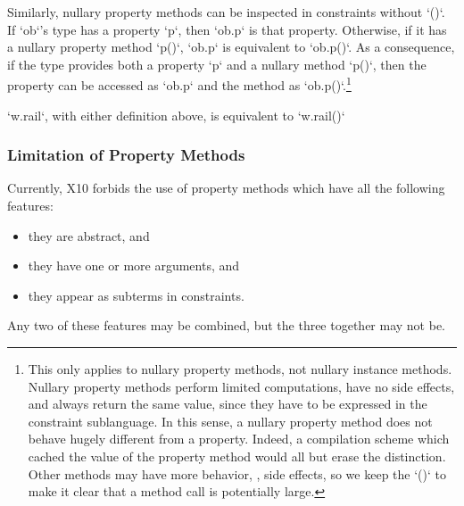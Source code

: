 Similarly, nullary property methods can be inspected in constraints without
\xcd`()`. If \xcd`ob`'s type has a property \xcd`p`, then \xcd`ob.p` is that
property. Otherwise, if it has a nullary property method \xcd`p()`, \xcd`ob.p`
is equivalent to \xcd`ob.p()`. As a consequence, if the type provides both a
property \xcd`p` and a nullary method \xcd`p()`, then the property can be
accessed as \xcd`ob.p` and the method as \xcd`ob.p()`.\footnote{This only
applies to nullary property methods, not nullary instance methods.  Nullary
property methods perform limited computations, have no side effects, and
always return the same value, since
they have to be expressed in the constraint sublanguage.  In this sense, a
nullary property method does not behave hugely different from a property.
Indeed, a compilation scheme which cached the value of the property method
would all but erase the distinction.  Other methods may
have more behavior, \eg, side effects, so we keep the \xcd`()` to make it
clear that a method call is potentially large.
}

\xcd`w.rail`, with either definition above, 
is equivalent to 
\xcd`w.rail()`


\subsubsection{Limitation of Property Methods}

\limitationx{} 
Currently, X10 forbids the use of property methods which have all the
following features: 
\begin{itemize}
\item they are abstract, and
\item they have one or more arguments, and
\item they appear as subterms in constraints.
\end{itemize}
Any two of these features may be combined, but the three together may not be. 

